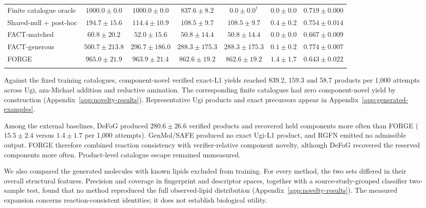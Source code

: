 \documentclass{article}
\theoremstyle{definition}
\newcommand{\ForgeProseCatalogueForgeBLComponentNovelPerThousand}{159.3}
\newcommand{\ForgeProseCatalogueForgeLXComponentNovelPerThousand}{58.7}
\newcommand{\ForgeProseCatalogueForgeUgiComponentNovelPerThousand}{839.2}
\newcommand{\ForgeProseCommonDefogExactPerThousand}{$280.6\pm26.6$}
\newcommand{\ForgeProseCommonDefogHeldPerThousand}{$15.5\pm2.4$}
\newcommand{\ForgeProseCommonForgeHeldPerThousand}{$1.4\pm1.7$}
\begin{document}
\begin{table}[htbp]
{\begin{tabular}{@{}>{\raggedright\arraybackslash}p{3.3cm}cccccc@{}}
Finite catalogue oracle & $1000.0\pm0.0$ & $1000.0\pm0.0$ & $837.6\pm8.2$ & $0.0\pm0.0^{\dagger}$ & $0.0\pm0.0$ & $0.719\pm0.000$ \\
Shared-null + post-hoc & $194.7\pm15.6$ & $114.4\pm10.9$ & $108.5\pm9.7$ & $108.5\pm9.7$ & $0.4\pm0.2$ & $0.754\pm0.014$ \\
FACT-matched & $60.8\pm20.2$ & $52.0\pm15.6$ & $50.8\pm14.4$ & $50.8\pm14.4$ & $0.0\pm0.0$ & $0.667\pm0.009$ \\
FACT-generous & $500.7\pm213.8$ & $296.7\pm186.0$ & $288.3\pm175.3$ & $288.3\pm175.3$ & $0.1\pm0.2$ & $0.774\pm0.007$ \\
\midrule
\cellcolor{forgerow}FORGE &\cellcolor{forgerow} $965.0\pm21.9$ &\cellcolor{forgerow} $963.9\pm21.4$ &\cellcolor{forgerow} $862.6\pm19.2$ &\cellcolor{forgerow} $862.6\pm19.2$ &\cellcolor{forgerow} $1.4\pm1.7$ &\cellcolor{forgerow} $0.643\pm0.022$ \\
\relax{}\end{tabular}
}
\end{table}

Against the fixed training catalogues, component-novel verified exact-L1 yields reached
\ForgeProseCatalogueForgeUgiComponentNovelPerThousand{},
\ForgeProseCatalogueForgeBLComponentNovelPerThousand{} and
\ForgeProseCatalogueForgeLXComponentNovelPerThousand{} products per 1,000 attempts across Ugi,
aza-Michael addition and reductive amination. The corresponding finite catalogues had zero
component-novel yield by construction (Appendix~\ref{app:novelty-results}). Representative Ugi
products and exact precursors appear in Appendix~\ref{app:generated-examples}.

Among the external baselines, DeFoG produced \ForgeProseCommonDefogExactPerThousand{} verified
products and recovered held components more often than FORGE
(\ForgeProseCommonDefogHeldPerThousand{} versus \ForgeProseCommonForgeHeldPerThousand{} per 1,000
attempts). GenMol/SAFE produced no exact Ugi-L1 product, and RGFN emitted no admissible output. FORGE therefore combined reaction consistency with verifier-relative component novelty,
although DeFoG recovered the reserved components more often. Product-level catalogue escape
remained unmeasured.

We also compared the generated molecules with known lipids excluded from training. For every
method, the two sets differed in their overall structural features.
Precision and coverage in fingerprint and descriptor spaces, together with a source-study-grouped classifier
two-sample test, found that no method reproduced the full observed-lipid distribution
(Appendix~\ref{app:novelty-results}). The measured expansion concerns reaction-consistent identities;
it does not establish biological utility.
\end{document}
